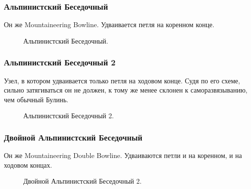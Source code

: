 \subsubsection*{Альпинистский Беседочный}

Он же Mountaineering Bowline. Удваивается петля на коренном конце.

\begin{figure}[H]\centering
	\begin{minipage}{1\linewidth}
		\begin{center}
			\tcbox[enhanced jigsaw,colframe=black,opacityframe=0.5,opacityback=0.5]
			{\centering{}}
		\end{center}
	\end{minipage}
\caption{Альпинистский Беседочный.}
\label{ris:Besedochny-Mountaineering}
\end{figure}

\subsubsection*{Альпинистский Беседочный 2}

Узел, в котором удваивается только петля на ходовом конце. Судя по его схеме, сильно затягиваться он не должен, к тому же менее склонен  к саморазвязыванию, чем обычный Булинь.

\begin{figure}[H]\centering
	\begin{minipage}{1\linewidth}
		\begin{center}
			\tcbox[enhanced jigsaw,colframe=black,opacityframe=0.5,opacityback=0.5]
			{\centering{}}
		\end{center}
	\end{minipage}
\caption{Альпинистский Беседочный 2.}
\label{ris:Besedochny-Mountaineering-2}
\end{figure}

\subsubsection*{Двойной Альпинистский Беседочный}

Он же Mountaineering Double Bowline. Удваиваются петли и на коренном, и на ходовом концах.

\begin{figure}[H]\centering
	\begin{minipage}{1\linewidth}
		\begin{center}
			\tcbox[enhanced jigsaw,colframe=black,opacityframe=0.5,opacityback=0.5]
			{\centering{}}
		\end{center}
	\end{minipage}
\caption{Двойной Альпинистский Беседочный 2.}
\label{ris:Besedochny-Mountaineering-Double}
\end{figure}

